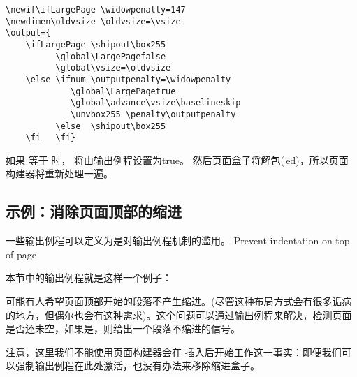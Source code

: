 \documentclass{book}
\begin{document}
\begin{verbatim}
\newif\ifLargePage \widowpenalty=147
\newdimen\oldvsize \oldvsize=\vsize
\output={
    \ifLargePage \shipout\box255
          \global\LargePagefalse
          \global\vsize=\oldvsize
    \else \ifnum \outputpenalty=\widowpenalty
             \global\LargePagetrue
             \global\advance\vsize\baselineskip
             \unvbox255 \penalty\outputpenalty
          \else  \shipout\box255
    \fi   \fi}
\end{verbatim}

如果  等于  时， 将由输出例程设置为true。 然后页面盒子将解包($\,$ed)，所以页面构建器将重新处理一遍。


\subsection{示例：消除页面顶部的缩进}

一些输出例程可以定义为是对输出例程机制的滥用。
\howto Prevent indentation on top of page\par
本节中的输出例程就是这样一个例子：



可能有人希望页面顶部开始的段落不产生缩进。(尽管这种布局方式会有很多诟病的地方，但偶尔也会有这种需求)。这个问题可以通过输出例程来解决，检测页面是否还未空，如果是，则给出一个段落不缩进的信号。


注意，这里我们不能使用页面构建器会在  插入后开始工作这一事实：即便我们可以强制输出例程在此处激活，也没有办法来移除缩进盒子。
\end{document}
